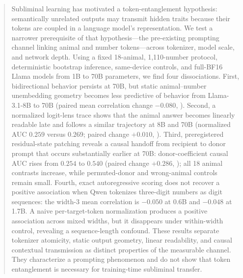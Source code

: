 \begin{abstract}
Subliminal learning has motivated a token-entanglement hypothesis: semantically
unrelated outputs may transmit hidden traits because their tokens are coupled in
a language model's representation. We test a narrower prerequisite of that
hypothesis---the pre-existing prompting channel linking animal and number
tokens---across tokenizer, model scale, and network depth. Using a fixed
18-animal, 1,110-number protocol, deterministic bootstrap inference,
same-device controls, and full-BF16 Llama models from 1B to 70B parameters, we
find four dissociations. First, bidirectional behavior persists at 70B, but
static animal--number unembedding geometry becomes less predictive of behavior
from Llama-3.1-8B to 70B (paired mean correlation change $-0.080$,
). Second, a normalized logit-lens trace shows that the
animal answer becomes linearly readable late and follows a similar trajectory
at 8B and 70B (normalized AUC $0.259$ versus $0.269$; paired change $+0.010$,
). Third, preregistered residual-state patching reveals
a causal handoff from recipient to donor prompt that occurs substantially
earlier at 70B: donor-coefficient causal AUC rises from $0.254$ to $0.540$
(paired change $+0.286$, ); all 18 animal contrasts
increase, while permuted-donor and wrong-animal controls remain small. Fourth,
exact autoregressive scoring does not recover a positive association when Qwen
tokenizes three-digit numbers as digit sequences: the width-3 mean correlation
is $-0.050$ at 0.6B and $-0.048$ at 1.7B. A naive per-target-token normalization
produces a positive association across mixed widths, but it disappears under
within-width control, revealing a sequence-length confound. These results
separate tokenizer atomicity, static output geometry, linear readability, and
causal contextual transmission as distinct properties of the measurable
channel. They characterize a prompting phenomenon and do not show that token
entanglement is necessary for training-time subliminal transfer.
\end{abstract}
